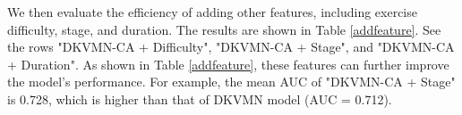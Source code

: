 \documentclass{edm_template}
\begin{document}
We then evaluate the efficiency of adding other features, including exercise difficulty, stage, and duration. The results are shown in Table \ref{addfeature}. See the rows "DKVMN-CA + Difficulty", "DKVMN-CA + Stage", and "DKVMN-CA + Duration". As shown in Table \ref{addfeature}, these features can further improve the model's performance. For example, the mean AUC of "DKVMN-CA + Stage" is 0.728, which is higher than that of DKVMN model (AUC = 0.712).





\end{document}
